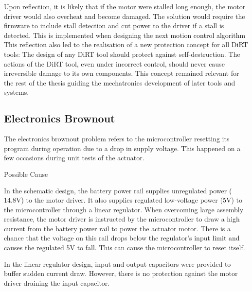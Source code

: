 Upon reflection, it is likely that if the motor were stalled long enough, the motor driver would also overheat and become damaged. The solution would require the firmware to include stall detection and cut power to the driver if a stall is detected. This is implemented when designing the next motion control algorithm 
This reflection also led to the realisation of a new protection concept for all DiRT tools: The design of any DiRT tool should protect against self-destruction. The actions of the DiRT tool, even under incorrect control, should never cause irreversible damage to its own components. This concept remained relevant for the rest of the thesis guiding the mechatronics development of later tools and systems.

\subsection{Electronics Brownout}
\label{subsection:exploration-1-electronics-brownout}

The electronics brownout problem refers to the microcontroller resetting its program  during operation due to a drop in supply voltage. This happened on a few occasions during unit tests of the actuator.

Possible Cause

In the schematic design, the battery power rail supplies unregulated power (~ 14.8V) to the motor driver. It also supplies regulated low-voltage power (5V) to the microcontroller through a linear regulator. When overcoming large assembly resistance, the motor driver is instructed by the microcontroller to draw a high current from the battery power rail to power the actuator motor. There is a chance that the voltage on this rail drops below the regulator’s input limit and causes the regulated 5V to fall. This can cause the microcontroller to reset itself.

In the linear regulator design, input and output capacitors were provided to buffer sudden current draw. However, there is no protection against the motor driver draining the input capacitor.

